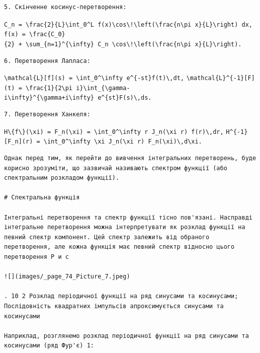 \documentclass[
  ukrainian,
]{article}
\begin{document}
\begin{verbatim}
5. Скінченне косинус-перетворення:
\end{verbatim}

\texttt{C\_n\ =\ \textbackslash{}frac\{2\}\{L\}\textbackslash{}int\_0\^{}L\ f(x)\textbackslash{}cos\textbackslash{}!\textbackslash{}left(\textbackslash{}frac\{n\textbackslash{}pi\ x\}\{L\}\textbackslash{}right)\ dx,}
\texttt{f(x)\ =\ \textbackslash{}frac\{C\_0\}\{2\}\ +\ \textbackslash{}sum\_\{n=1\}\^{}\{\textbackslash{}infty\}\ C\_n\ \textbackslash{}cos\textbackslash{}!\textbackslash{}left(\textbackslash{}frac\{n\textbackslash{}pi\ x\}\{L\}\textbackslash{}right).}

\begin{verbatim}
6. Перетворення Лапласа:
\end{verbatim}

\texttt{\textbackslash{}mathcal\{L\}{[}f{]}(s)\ =\ \textbackslash{}int\_0\^{}\textbackslash{}infty\ e\^{}\{-st\}f(t)\textbackslash{},dt,}
\texttt{\textbackslash{}mathcal\{L\}\^{}\{-1\}{[}F{]}(t)\ =\ \textbackslash{}frac\{1\}\{2\textbackslash{}pi\ i\}\textbackslash{}int\_\{\textbackslash{}gamma-i\textbackslash{}infty\}\^{}\{\textbackslash{}gamma+i\textbackslash{}infty\}\ e\^{}\{st\}F(s)\textbackslash{},ds.}

\begin{verbatim}
7. Перетворення Ханкеля:
\end{verbatim}

\texttt{H\textbackslash{}\{f\textbackslash{}\}(\textbackslash{}xi)\ =\ F\_n(\textbackslash{}xi)\ =\ \textbackslash{}int\_0\^{}\textbackslash{}infty\ r\ J\_n(\textbackslash{}xi\ r)\ f(r)\textbackslash{},dr,}
\texttt{H\^{}\{-1\}{[}F\_n{]}(r)\ =\ \textbackslash{}int\_0\^{}\textbackslash{}infty\ \textbackslash{}xi\ J\_n(\textbackslash{}xi\ r)\ F\_n(\textbackslash{}xi)\textbackslash{},d\textbackslash{}xi.}

\begin{verbatim}
Однак перед тим, як перейти до вивчення інтегральних перетворень, буде корисно зрозуміти, що зазвичай називають спектром функції (або спектральним розкладом функції).

# Спектральна функція

Інтегральні перетворення та спектр функції тісно пов'язані. Насправді інтегральне перетворення можна інтерпретувати як розклад функції на певний спектр компонент. Цей спектр залежить від обраного перетворення, але кожна функція має певний спектр відносно цього перетворення Р и с

![](images/_page_74_Picture_7.jpeg)

. 10 2 Розклад періодичної функції на ряд синусами та косинусами; Послідовність квадратних імпульсів апроксимується синусами та косинусами

Наприклад, розглянемо розклад періодичної функції на ряд синусами та косинусами (ряд Фур'є) 1:
\end{verbatim}
\end{document}
